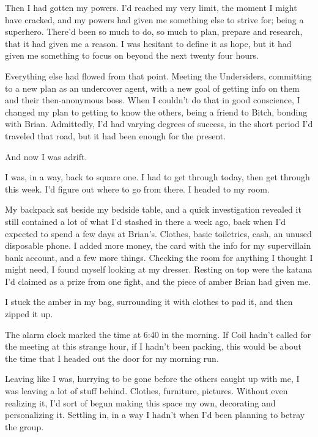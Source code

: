 Then I had gotten my powers.  I'd reached my very limit, the moment I might have cracked, and my powers had given me something else to strive for; being a superhero.  There'd been so much to do, so much to plan, prepare and research, that it had given me a reason.  I was hesitant to define it as hope, but it had given me something to focus on beyond the next twenty four hours.



Everything else had flowed from that point.  Meeting the Undersiders, committing to a new plan as an undercover agent, with a new goal of getting info on them and their then-anonymous boss.  When I couldn't do that in good conscience, I changed my plan to getting to know the others, being a friend to Bitch, bonding with Brian.  Admittedly, I'd had varying degrees of success, in the short period I'd traveled that road, but it had been enough for the present.



And now I was adrift.



I was, in a way, back to square one.  I had to get through today, then get through this week.  I'd figure out where to go from there.  I headed to my room.



My backpack sat beside my bedside table, and a quick investigation revealed it still contained a lot of what I'd stashed in there a week ago, back when I'd expected to spend a few days at Brian's.  Clothes, basic toiletries, cash, an unused disposable phone.  I added more money, the card with the info for my supervillain bank account, and a few more things.  Checking the room for anything I thought I might need, I found myself looking at my dresser.  Resting on top were the katana I'd claimed as a prize from one fight, and the piece of amber Brian had given me.



I stuck the amber in my bag, surrounding it with clothes to pad it, and then zipped it up.



The alarm clock marked the time at 6:40 in the morning.  If Coil hadn't called for the meeting at this strange hour, if I hadn't been packing, this would be about the time that I headed out the door for my morning run.



Leaving like I was, hurrying to be gone before the others caught up with me, I was leaving a lot of stuff behind.  Clothes, furniture, pictures.  Without even realizing it, I'd sort of begun making this space my own, decorating and personalizing it.  Settling in, in a way I hadn't when I'd been planning to betray the group.



